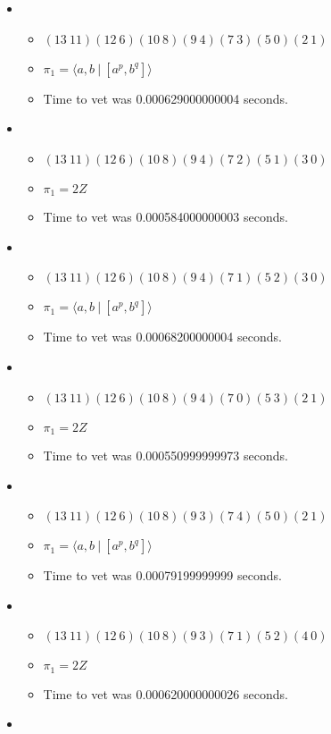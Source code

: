 \documentclass{article}
\begin{document}
\begin{itemize}
\item \begin{itemize}
      \item $(13\ 11)(12\ 6)(10\ 8)(9\ 4)(7\ 3)(5\ 0)(2\ 1)$
      \item $\pi_1 = \langle a,b\ |\ [a^p,b^q]\rangle$
      \item Time to vet was 0.000629000000004 seconds.
\end{itemize}
\item \begin{itemize}
      \item $(13\ 11)(12\ 6)(10\ 8)(9\ 4)(7\ 2)(5\ 1)(3\ 0)$
      \item $\pi_1 =2 Z$
      \item Time to vet was 0.000584000000003 seconds.
\end{itemize}
\item \begin{itemize}
      \item $(13\ 11)(12\ 6)(10\ 8)(9\ 4)(7\ 1)(5\ 2)(3\ 0)$
      \item $\pi_1 = \langle a,b\ |\ [a^p,b^q]\rangle$
      \item Time to vet was 0.00068200000004 seconds.
\end{itemize}
\item \begin{itemize}
      \item $(13\ 11)(12\ 6)(10\ 8)(9\ 4)(7\ 0)(5\ 3)(2\ 1)$
      \item $\pi_1 =2 Z$
      \item Time to vet was 0.000550999999973 seconds.
\end{itemize}
\item \begin{itemize}
      \item $(13\ 11)(12\ 6)(10\ 8)(9\ 3)(7\ 4)(5\ 0)(2\ 1)$
      \item $\pi_1 = \langle a,b\ |\ [a^p,b^q]\rangle$
      \item Time to vet was 0.00079199999999 seconds.
\end{itemize}
\item \begin{itemize}
      \item $(13\ 11)(12\ 6)(10\ 8)(9\ 3)(7\ 1)(5\ 2)(4\ 0)$
      \item $\pi_1 =2 Z$
      \item Time to vet was 0.000620000000026 seconds.
\end{itemize}
\item \begin{itemize}

\end{itemize}
\end{itemize}
\end{document}
